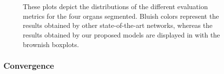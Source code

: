 \documentclass[journal]{IEEEtran}
\begin{document}
\begin{figure}[h!]
{} \\
\\
    \caption{These plots depict the distributions of the different evaluation metrics for the four organs segmented. Bluish colors represent the results obtained by other state-of-the-art networks, whereas the results obtained by our proposed models are displayed in with the brownish boxplots.}
    \label{fig:metrics}
\end{figure}


\subsubsection{\textbf{Convergence}}
\end{document}
